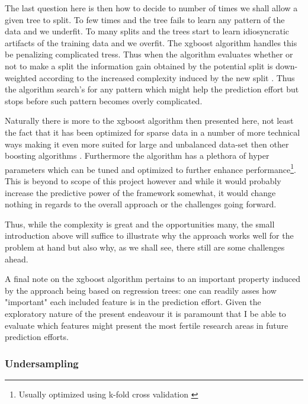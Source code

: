 \documentclass[a4paper]{article}
\begin{document}
The last question here is then how to decide to number of times we shall allow a given tree to split. To few times and the tree fails to learn any pattern of the data and we underfit. To many splits and the trees start to learn idiosyncratic artifacts of the training data and we overfit. The xgboost algorithm handles this be penalizing complicated tress. Thus when the algorithm evaluates whether or not to make a split the information gain obtained by the potential split is down-weighted according to the increased complexity induced by the new split \cite[4-7]{Chen_2016}. Thus the algorithm search's for any pattern which might help the prediction effort but stops before such pattern becomes overly complicated.\par 

Naturally there is more to the xgboost algorithm then presented here, not least the fact that it has been optimized for sparse data in a number of more technical ways making it even more suited for large and unbalanced data-set then other boosting algorithms \cite[5]{Chen_2016}. Furthermore the algorithm has a plethora of hyper parameters which can be tuned and optimized to further enhance performance\footnote{Usually optimized using k-fold cross validation \citep[241-249]{Friedman_2001}}. This is beyond to scope of this project however and while it would probably increase the predictive power of the framework somewhat, it would change nothing in regards to the overall approach or the challenges going forward.\par 

Thus, while the complexity is great and the opportunities many, the small introduction above will suffice to illustrate why the approach works well for the problem at hand but also why, as we shall see, there still are some challenges ahead.\par

A final note on the xgboost algorithm pertains to an important property induced by the approach being based on regression trees: one can readily asses how "important" each included feature is in the prediction effort. Given the exploratory nature of the present endeavour it is paramount that I be able to evaluate which features might present the most fertile research areas in future prediction efforts.\par

\subsubsection{Undersampling}
\end{document}
